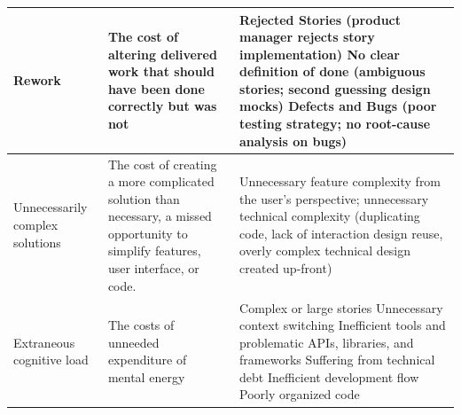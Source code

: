 \begin{table}[t]
\begin{tabular}{|p{1.5in}|p{1.9in}|p{3.2in}|}
Rework                                & The cost of altering delivered work that should have been done correctly but was not & Rejected Stories (product manager rejects story implementation) \newline No clear definition of done (ambiguous stories; second guessing design mocks) \newline Defects and Bugs (poor testing strategy; no root-cause analysis on bugs)                                                                                                                                                                   \\ \hline
Unnecessarily complex solutions  & The cost of creating a more complicated solution than necessary,  a missed opportunity to simplify features, user interface, or code.      & 
Unnecessary feature complexity from the user's perspective; unnecessary technical complexity (duplicating code, lack of interaction design reuse, overly complex technical design created up-front)
\\ \hline
Extraneous cognitive load &  The costs of unneeded expenditure of mental energy  &  
Complex or large stories \newline	
Unnecessary context switching \newline	
Inefficient tools and problematic APIs, libraries, and frameworks \newline	
Suffering from technical debt \newline	
Inefficient development flow \newline	
Poorly organized code \newline	
\\ \hline


\end{tabular}
\end{table}

